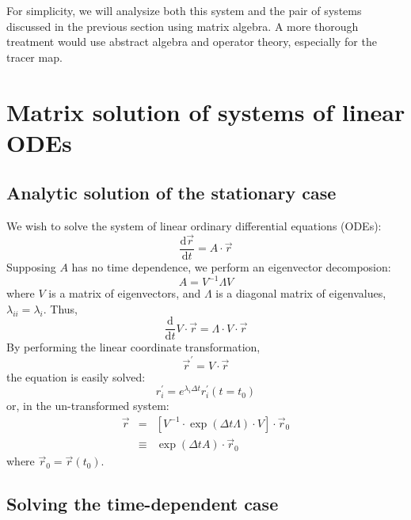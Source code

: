 \documentclass[11pt]{article}
\begin{document}
For simplicity, we will analysize both this system and the pair of systems
discussed in the previous section using matrix algebra.  A more thorough
treatment would use abstract algebra and operator theory, especially for
the tracer map.

\section{Matrix solution of systems of linear ODEs} 

\subsection{Analytic solution of the stationary case}

We wish to solve the system of linear ordinary differential equations (ODEs):
\begin{equation}
\frac{\mathrm d \vec r}{\mathrm d t}=A \cdot \vec r
\label{linear_ODE_system_vector_soln}
\end{equation}
Supposing $A$ has no time dependence, we perform an eigenvector 
decomposion:
\begin{equation}
A = V^{-1} \Lambda V
\end{equation}
where $V$ is a matrix of eigenvectors, and $\Lambda$ is a diagonal matrix
of eigenvalues, $\lambda_{ii}=\lambda_i$.  Thus,
\begin{equation}
\frac{\mathrm d}{\mathrm d t} V \cdot \vec r=\Lambda \cdot V \cdot  \vec r
\end{equation}
By performing the linear coordinate transformation,
\begin{equation}
\vec r^\prime=V \cdot \vec r
\end{equation}
the equation is easily solved:
\begin{equation}
r^\prime_i = e^{\lambda_i \Delta t} r^\prime_i(t=t_0)
\end{equation}
or, in the un-transformed system:
\begin{eqnarray}
\vec r & = & \left [V^{-1} \cdot \exp(\Delta t \Lambda) \cdot V \right ] \cdot \vec r_0 
\label{solution_no_time_dependence} \\
& \equiv & \exp(\Delta t A)\cdot \vec r_0
\end{eqnarray}
where $\vec r_0=\vec r(t_0)$.

\subsection{Solving the time-dependent case}
\end{document}
